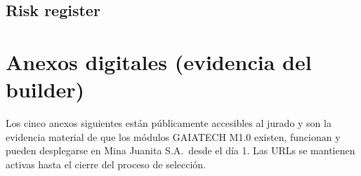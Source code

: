 \documentclass[12pt,a4paper]{article}
\begin{document}
\subsection{Risk register}



\section{Anexos digitales (evidencia del builder)}
\label{sec:anexos}

Los cinco anexos siguientes están públicamente accesibles al jurado y son la evidencia material de que los módulos GAIATECH M1.0 existen, funcionan y pueden desplegarse en Mina Juanita S.A.\ desde el día 1. Las URLs se mantienen activas hasta el cierre del proceso de selección.
\end{document}
